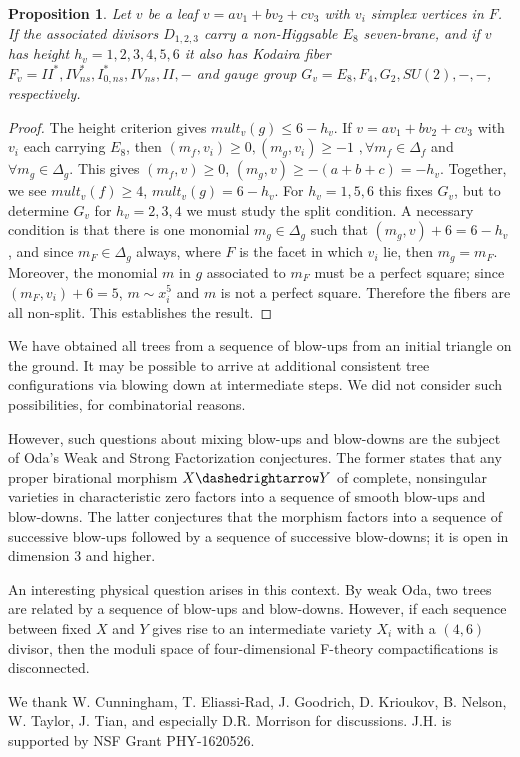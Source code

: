 \documentclass[aps,prl,twocolumn, superscriptaddress,groupedaddress,nofootinbib]{revtex4-1}
\newtheorem{prop}{Proposition}
\begin{document}
\begin{prop}
\label{prop:E8roots}
Let $v$ be a leaf $v=av_1 + bv_2 + cv_3$ with $v_i$ simplex vertices in $F$. If the associated divisors $D_{1,2,3}$
carry a non-Higgsable $E_8$ seven-brane, and if $v$ has height
 $h_v=1,2,3,4,5,6$ it also has Kodaira fiber $F_v=II^*,IV^*_{ns},I^*_{0,ns},IV_{ns},II,-$
and gauge group $G_v=E_8,F_4,G_2,SU(2),-,-$, respectively.
\end{prop}
\begin{proof}
The height criterion
gives $mult_v(g)\leq 6-h_v$. If $v=av_1+bv_2+cv_3$ with $v_i$ each carrying $E_8$,
then 
$(m_f,v_i)\geq 0, (m_g,v_i)\geq -1\,\,, \forall m_f\in \Delta_f 
$ and $\forall m_g\in \Delta_g$.
This gives $(m_f,v)\geq 0$, $(m_g,v)\geq-(a+b+c)= -h_v$. Together, we see
$mult_v(f)\geq 4$, $mult_v(g)=6-h_v$. For $h_v= 1,5,6$ this fixes $G_v$, but 
to determine $G_v$ for $h_v=2,3,4$ we must study the split condition. A necessary
condition is that there is one monomial $m_g\in \Delta_g$ such that $(m_g,v)+6=6-h_v$,
and since $m_F \in \Delta_g$ always, where $F$ is the facet in which $v_i$ lie,
then $m_g=m_F$. Moreover, the monomial $m$ in $g$ associated to $m_F$ must be a perfect
square; since $(m_F,v_i)+6=5$, $m\sim x_i^5$ and $m$ is not a perfect square. 
Therefore the fibers are all non-split. This establishes the result.
\end{proof}


  We have obtained all trees from a sequence of blow-ups from an
initial triangle on the ground. It may be possible to arrive at additional consistent tree
configurations via  blowing down at intermediate steps. We did not consider
such possibilities, for combinatorial reasons.

However, such questions about mixing blow-ups and blow-downs are the subject
of Oda's Weak and Strong Factorization conjectures. The former states that any proper birational morphism $X \dashedrightarrow Y$ of complete, nonsingular varieties in characteristic zero factors into a sequence of smooth blow-ups and blow-downs. The latter conjectures
that the morphism factors into a sequence of successive blow-ups followed by a sequence of
successive blow-downs; it is open in dimension 3 and higher.

An interesting physical question arises in this context. By weak Oda, two trees are
related by a sequence of blow-ups and blow-downs. However, if each sequence between
fixed $X$ and $Y$ gives rise to an intermediate variety $X_i$ with a $(4,6)$ divisor,
then the moduli space of four-dimensional F-theory compactifications is disconnected.

\vspace{.2cm}
 We thank W. Cunningham, T. Eliassi-Rad, J. Goodrich,  D. Krioukov, B. Nelson, W. Taylor, J. Tian,
and especially D.R. Morrison for discussions. 
J.H. is supported by
NSF Grant PHY-1620526.




\end{document}
